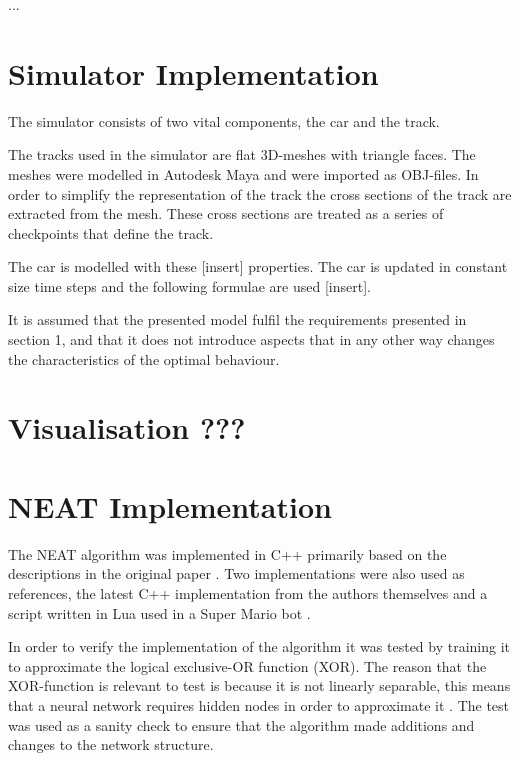 ...


\section{Simulator Implementation}

The simulator consists of two vital components, the car and the track.

The tracks used in the simulator are flat 3D-meshes with triangle faces. The meshes were modelled in Autodesk Maya and were imported as OBJ-files. In order to simplify the representation of the track the cross sections of the track are extracted from the mesh. These cross sections are treated as a series of checkpoints that define the track.  

The car is modelled with these [insert] properties. The car is updated in constant size time steps and the following formulae are used [insert].

It is assumed that the presented model fulfil the requirements presented in section 1, and that it does not introduce aspects that in any other way changes the characteristics of the optimal behaviour.

\section{Visualisation ???}

\section{NEAT Implementation}

The NEAT algorithm was implemented in C++ primarily based on the descriptions in the original paper \cite{stanley:neat}. Two implementations were also used as references, the latest C++ implementation from the authors themselves \cite{neat_source} and a script written in Lua used in a Super Mario bot \cite{mario_source}. 

In order to verify the implementation of the algorithm it was tested by training it to approximate the logical exclusive-OR function (XOR). The reason that the XOR-function is relevant to test is because it is not linearly separable, this means that a neural network requires  hidden nodes  in order to approximate it \cite{haykin:xor, stanley:neat}. The test was used as a sanity check to ensure that the algorithm made additions and changes to the network structure. 

